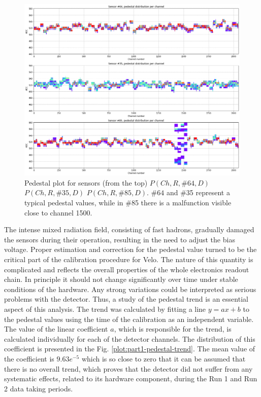 \begin{figure}
    \centering
    \includegraphics[width=0.6\linewidth]{figures/chapter4/calib_analysis/Part1-outliers-pedestals-cases.png}
    \caption{Pedestal plot for sensors (from the top) $P(Ch, R, \#64, D)$ $P(Ch, R, \#35, D)$ $P(Ch, R, \#85, D)$. $\#64$ and \#35 represent a typical pedestal values, while in \#85 there is a malfunction visible close to channel 1500.}
    \label{plot:par1-pedestal-sensors}
\end{figure}

The intense mixed radiation field, consisting of fast hadrons, gradually damaged the sensors during their operation, resulting in the need to adjust the bias voltage.
Proper estimation and correction for the pedestal value turned to be the critical part of the calibration procedure for Velo. The nature of this quantity is complicated and reflects the overall properties of the whole electronics readout chain. In principle it should not change significantly over time under stable conditions of the hardware. Any strong variations could be interpreted as serious problems with the detector.
Thus, a study of the pedestal trend is an essential aspect of this analysis.
The trend was calculated by fitting a line $y=ax+b$ to the pedestal values using the time of the calibration as an independent variable.
The value of the linear coefficient $a$, which is responsible for the trend, is calculated individually for each of the detector channels.
The distribution of this coefficient is presented in the Fig. \ref{plot:part1-pedestal-trend}.
The mean value of the coefficient is $9.63e^{-5}$ which is so close to zero that it can be assumed that there is no overall trend, which proves that the detector did not suffer from any systematic effects, related to its hardware component, during the Run 1 and Run 2 data taking periods.

